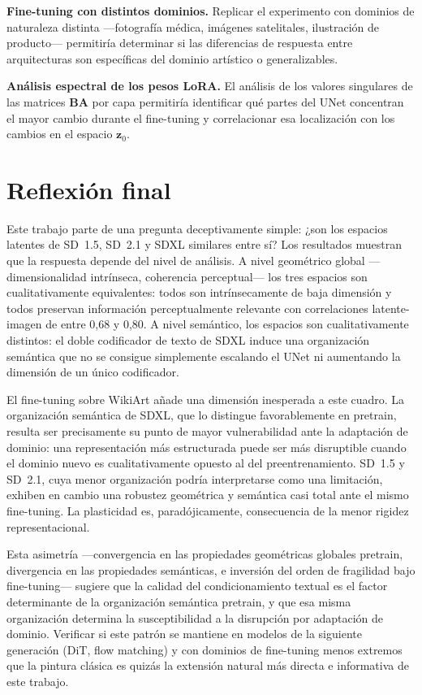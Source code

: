 \documentclass[12pt, a4paper, twoside]{book}
\newcommand{\z}{\mathbf{z}}
\begin{document}
\textbf{Fine-tuning con distintos dominios.} Replicar el experimento con dominios de naturaleza distinta ---fotografía médica, imágenes satelitales, ilustración de producto--- permitiría determinar si las diferencias de respuesta entre arquitecturas son específicas del dominio artístico o generalizables.

\textbf{Análisis espectral de los pesos LoRA.} El análisis de los valores singulares de las matrices $\mathbf{B}\mathbf{A}$ por capa permitiría identificar qué partes del UNet concentran el mayor cambio durante el fine-tuning y correlacionar esa localización con los cambios en el espacio $\z_0$.

\section{Reflexión final}
\label{sec:concl:reflexion}

Este trabajo parte de una pregunta deceptivamente simple: ¿son los espacios latentes de SD~1.5, SD~2.1 y SDXL similares entre sí? Los resultados muestran que la respuesta depende del nivel de análisis. A nivel geométrico global ---dimensionalidad intrínseca, coherencia perceptual--- los tres espacios son cualitativamente equivalentes: todos son intrínsecamente de baja dimensión y todos preservan información perceptualmente relevante con correlaciones latente-imagen de entre 0,68 y 0,80. A nivel semántico, los espacios son cualitativamente distintos: el doble codificador de texto de SDXL induce una organización semántica que no se consigue simplemente escalando el UNet ni aumentando la dimensión de un único codificador.

El fine-tuning sobre WikiArt añade una dimensión inesperada a este cuadro. La organización semántica de SDXL, que lo distingue favorablemente en pretrain, resulta ser precisamente su punto de mayor vulnerabilidad ante la adaptación de dominio: una representación más estructurada puede ser más disruptible cuando el dominio nuevo es cualitativamente opuesto al del preentrenamiento. SD~1.5 y SD~2.1, cuya menor organización podría interpretarse como una limitación, exhiben en cambio una robustez geométrica y semántica casi total ante el mismo fine-tuning. La plasticidad es, paradójicamente, consecuencia de la menor rigidez representacional.

Esta asimetría ---convergencia en las propiedades geométricas globales pretrain, divergencia en las propiedades semánticas, e inversión del orden de fragilidad bajo fine-tuning--- sugiere que la calidad del condicionamiento textual es el factor determinante de la organización semántica pretrain, y que esa misma organización determina la susceptibilidad a la disrupción por adaptación de dominio. Verificar si este patrón se mantiene en modelos de la siguiente generación (DiT, flow matching) y con dominios de fine-tuning menos extremos que la pintura clásica es quizás la extensión natural más directa e informativa de este trabajo.
\end{document}

